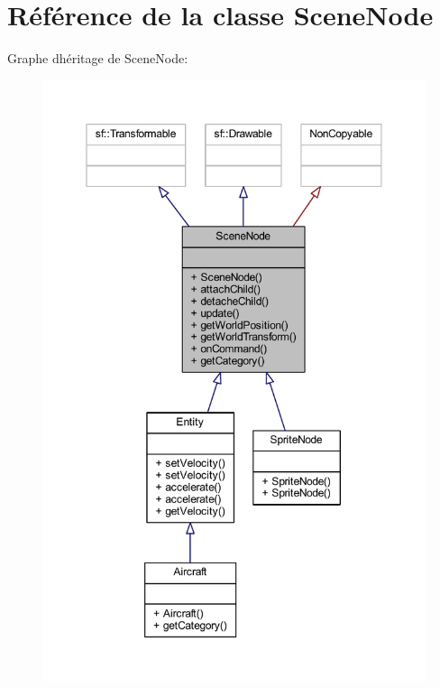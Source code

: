 \hypertarget{class_scene_node}{}\section{Référence de la classe Scene\+Node}
\label{class_scene_node}


Graphe d\textquotesingle{}héritage de Scene\+Node\+:\nopagebreak
\begin{figure}[H]
\begin{center}
\leavevmode
\includegraphics[width=350pt]{class_scene_node__inherit__graph}
\end{center}
\end{figure}


